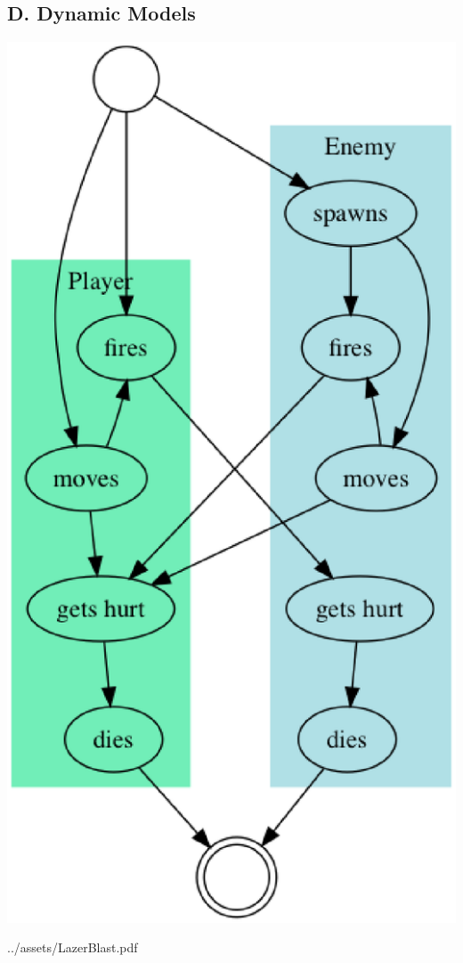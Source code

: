 \subsection*{D. Dynamic Models}
    \includegraphics[width=0.75\linewidth]{../assets/dynamic_models}


           {../assets/LazerBlast.pdf}
